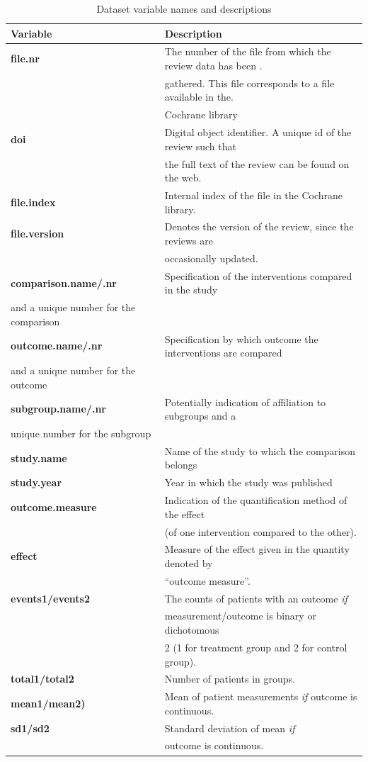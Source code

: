 \documentclass[11pt,a4paper,twoside]{book}\usepackage[]{graphicx}\usepackage[]{color}
\begin{document}
\begin{table}[ht]
  \begin{center}
    \begin{tabular}{l l}
      \textbf{Variable} & \textbf{Description}\\
      \hline
      \textbf{file.nr} & The number of the file from which the review data has been . \\&gathered. This file corresponds to a file available in the. \\& Cochrane library\\
      \textbf{doi} & Digital object identifier. A unique id of the review such that  \\ &the full text of the review can be found on the web.\\
      \textbf{file.index} & Internal index of the file in the Cochrane library.\\
      \textbf{file.version} & Denotes the version of the review, since the reviews are \\ &occasionally updated.\\
      \hline
      \textbf{comparison.name/.nr} & Specification of the interventions compared in the study  \\ and a unique number for the comparison\\
      \textbf{outcome.name/.nr} & Specification by which outcome the interventions are compared\\ and a unique number for the outcome\\
      \textbf{subgroup.name/.nr} & Potentially indication of affiliation to subgroups and a \\ unique number for the subgroup\\
      \textbf{study.name} & Name of the study to which the comparison belongs\\
      \textbf{study.year} & Year in which the study was published\\
      \textbf{outcome.measure} & Indication of the quantification method of the effect \\ &(of one intervention compared to the other).\\
      \textbf{effect} & Measure of the effect given in the quantity denoted by \\ &``outcome measure''.\\
      \textbf{events1/events2} & The counts of patients with an outcome \textit{if}\\ & measurement/outcome is binary or dichotomous \\ &2 (1 for treatment group and 2 for control group).\\
      \textbf{total1/total2} & Number of patients in groups.\\
      \textbf{mean1/mean2)} & Mean of patient measurements \textit{if} outcome is continuous.\\
      \textbf{sd1/sd2} & Standard deviation of mean \textit{if} \\ &outcome is continuous.
    \end{tabular}
  \caption{Dataset variable names and descriptions  \label{variable}}


\end{center}
\end{table}
\end{document}
